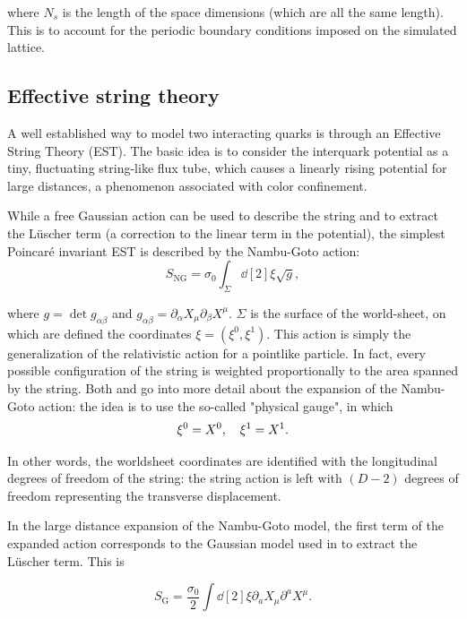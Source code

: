 \documentclass[reqno,12pt]{article}
\numberwithin{equation}{section}
\begin{document}
where $N_s$ is the length of the space dimensions (which are all the same length). This is to account for the periodic boundary conditions
imposed on the simulated lattice.

\subsection{Effective string theory}

A well established way to model two interacting quarks is through an Effective String Theory (EST). The basic idea is to consider the interquark
potential as a tiny, fluctuating string-like flux tube, which causes a linearly rising potential for large distances, a phenomenon associated
with color confinement.

While a free Gaussian action can be used to describe the string and to extract the L{\"u}scher term \cite{caselle}
(a correction to the linear term in the potential), the simplest Poincaré invariant EST is described by the Nambu-Goto action:
\begin{equation}
	S_\text{NG} = \sigma_0 \int_\Sigma \dd[2]\xi \sqrt{g},
\end{equation}

where $g = \det g_{\alpha\beta}$ and $g_{\alpha\beta} = \partial_\alpha X_\mu \partial_\beta X^\mu$. $\Sigma$ is the surface of the
world-sheet, on which are defined the coordinates $\xi = (\xi^0, \xi^1)$. This action is simply the generalization of the relativistic
action for a pointlike particle. In fact, every possible configuration of the string is weighted proportionally to the area spanned by
the string. Both \cite{caselle} and \cite{caristo} go into more detail about the expansion of the Nambu-Goto action: the idea is to
use the so-called "physical gauge", in which 
\begin{equation}
	\xi^0 = X^0 \qc \xi^1 = X^1.
\end{equation} 

In other words, the worldsheet coordinates are identified with the longitudinal degrees of freedom of the string: the string action is left with
$(D-2)$ degrees of freedom representing the transverse displacement. 

In the large distance expansion of the Nambu-Goto model, the first term of the expanded action corresponds to the Gaussian model
used in \cite{caselle} to extract the L{\"u}scher term. This is

\begin{equation}
	S_\text{G} = \frac{\sigma_0}{2} \int \dd[2]{\xi} \partial_a X_\mu \partial^a X^\mu.
\end{equation}
\end{document}
